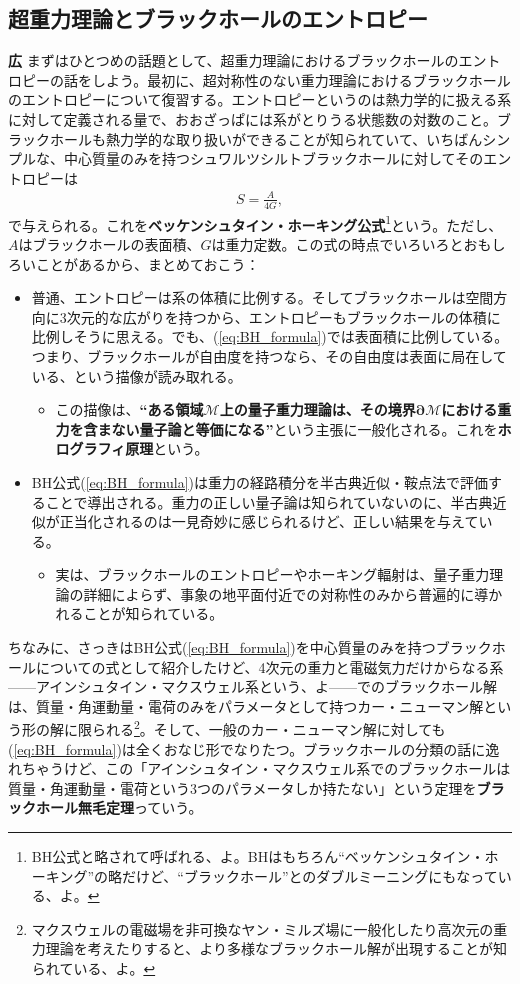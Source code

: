 \documentclass[paper=b5j,fontsize=12Q,jafontsize=12Q,baselineskip=21Q]{jlreq}
\DeclareRobustCommand{\hiron}{\textbf{広 }}
\begin{document}
\begin{refsection}
\subsection{超重力理論とブラックホールのエントロピー}
\hiron まずはひとつめの話題として、超重力理論におけるブラックホールのエントロピーの話をしよう。最初に、超対称性のない重力理論におけるブラックホールのエントロピーについて復習する。エントロピーというのは熱力学的に扱える系に対して定義される量で、おおざっぱには系がとりうる状態数の対数のこと。ブラックホールも熱力学的な取り扱いができることが知られていて、いちばんシンプルな、中心質量のみを持つシュワルツシルトブラックホールに対してそのエントロピーは
\begin{align}
  S=\frac A{4G},\label{eq:BH_formula}
\end{align}
で与えられる。これを\textbf{ベッケンシュタイン・ホーキング公式}\footnote{BH公式と略されて呼ばれる、よ。BHはもちろん``ベッケンシュタイン・ホーキング''の略だけど、``ブラックホール''とのダブルミーニングにもなっている、よ。}という。ただし、$A$はブラックホールの表面積、$G$は重力定数。この式の時点でいろいろとおもしろいことがあるから、まとめておこう：
\begin{itemize}
  \item 普通、エントロピーは系の体積に比例する。そしてブラックホールは空間方向に3次元的な広がりを持つから、エントロピーもブラックホールの体積に比例しそうに思える。でも、(\ref{eq:BH_formula})では表面積に比例している。つまり、ブラックホールが自由度を持つなら、その自由度は表面に局在している、という描像が読み取れる。
  \begin{itemize}
    \item この描像は、\textbf{``ある領域$\bm{\mathcal M}$上の量子重力理論は、その境界$\bm{\partial\mathcal M}$における重力を含まない量子論と等価になる''}という主張に一般化される。これを\textbf{ホログラフィ原理}という。
  \end{itemize}
  \item BH公式(\ref{eq:BH_formula})は重力の経路積分を半古典近似・鞍点法で評価することで導出される。重力の正しい量子論は知られていないのに、半古典近似が正当化されるのは一見奇妙に感じられるけど、正しい結果を与えている。
  \begin{itemize}
    \item 実は、ブラックホールのエントロピーやホーキング輻射は、量子重力理論の詳細によらず、事象の地平面付近での対称性のみから普遍的に導かれることが知られている。
  \end{itemize}
\end{itemize}
ちなみに、さっきはBH公式(\ref{eq:BH_formula})を中心質量のみを持つブラックホールについての式として紹介したけど、4次元の重力と電磁気力だけからなる系------アインシュタイン・マクスウェル系という、よ------でのブラックホール解は、質量・角運動量・電荷のみをパラメータとして持つカー・ニューマン解という形の解に限られる\footnote{マクスウェルの電磁場を非可換なヤン・ミルズ場に一般化したり高次元の重力理論を考えたりすると、より多様なブラックホール解が出現することが知られている、よ。}。そして、一般のカー・ニューマン解に対しても(\ref{eq:BH_formula})は全くおなじ形でなりたつ。ブラックホールの分類の話に逸れちゃうけど、この「アインシュタイン・マクスウェル系でのブラックホールは質量・角運動量・電荷という3つのパラメータしか持たない」という定理を\textbf{ブラックホール無毛定理}っていう。

\end{refsection}
\end{document}
